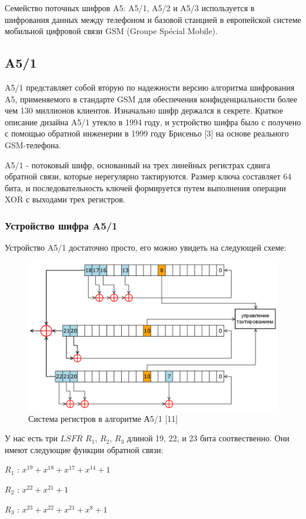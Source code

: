 \documentclass[colorthm]{./civarticle}
\begin{document}
Семейство поточных шифров A5: A5/1, A5/2 и A5/3 используется в шифрования данных между телефоном и базовой станцией в европейской системе мобильной цифровой связи GSM (Groupe Spécial Mobile).

\subsection{A5/1} 

A5/1 представляет собой вторую по надежности версию алгоритма шифрования A5, применяемого в стандарте GSM для обеспечения конфиденциальности более чем 130 миллионов клиентов. Изначально шифр держался в секрете. Краткое описание дизайна A5/1 утекло в 1994 году, и устройство шифра было с получено с помощью обратной инженерии в 1999 году Брисеньо [3] на основе реального GSM-телефона.

A5/1 - потоковый шифр, основанный на трех линейных регистрах сдвига обратной связи, которые нерегулярно тактируются. Размер ключа составляет 64 бита, и последовательность ключей формируется путем выполнения операции XOR с выходами трех регистров.

\subsubsection{Устройство шифра A5/1}

Устройство A5/1 достаточно просто, его можно увидеть на следующей схеме:

\begin{figure}[H]
    \centering
    \includegraphics[width=0.5\linewidth]{РСЛОС_в_A5.png}
    \caption{Система регистров в алгоритме А5/1 [11]}
    \label{fig:enter-label}
\end{figure}

У нас есть три $LSFR$ $R_1$, $R_2$, $R_3$ длиной 19, 22, и 23 бита соотвественно. Они имеют следующие функции обратной связи:

$R_1$ : $x^{19} + x^{18} + x^{17} + x^{14} + 1$

$R_2$ : $x^{22} + x^{21} + 1$

$R_3$ : $x^{23} + x^{22} + x^{21} + x^{8} + 1$
\end{document}
